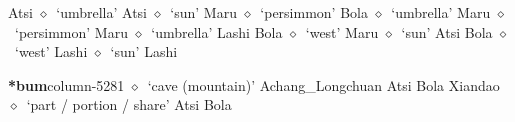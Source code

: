          Atsi 
\hspace{1ex}
         $\diamond$~`umbrella'
         Atsi 
\hspace{1ex}
         $\diamond$~`sun'
         Maru 
\hspace{1ex}
         $\diamond$~`persimmon'
         Bola 
\hspace{1ex}
         $\diamond$~`umbrella'
         Maru 
\hspace{1ex}
         $\diamond$~`persimmon'
         Maru 
\hspace{1ex}
         $\diamond$~`umbrella'
         Lashi 
\hspace{1ex}
         Bola 
\hspace{1ex}
         $\diamond$~`west'
         Maru 
\hspace{1ex}
         $\diamond$~`sun'
         Atsi 
\hspace{1ex}
         Bola 
\hspace{1ex}
         $\diamond$~`west'
         Lashi 
\hspace{1ex}
         $\diamond$~`sun'
         Lashi 
  \item {\footnotesize \textbf{*bum}}{\tiny column-5281}
         $\diamond$~`cave (mountain)'
         Achang\_Longchuan 
\hspace{1ex}
         Atsi 
\hspace{1ex}
         Bola 
\hspace{1ex}
         Xiandao 
\hspace{1ex}
         $\diamond$~`part / portion / share'
         Atsi 
\hspace{1ex}
         Bola 
